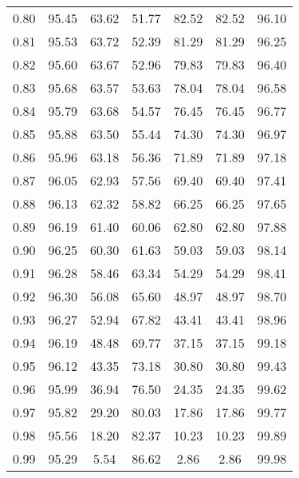 \begin{tabular}{|c|c|c|c|c|c|c|}
      0.80 &     95.45 &     63.62 &      51.77 &   82.52 &      82.52 &         96.10 \\
      0.81 &     95.53 &     63.72 &      52.39 &   81.29 &      81.29 &         96.25 \\
      0.82 &     95.60 &     63.67 &      52.96 &   79.83 &      79.83 &         96.40 \\
      0.83 &     95.68 &     63.57 &      53.63 &   78.04 &      78.04 &         96.58 \\
      0.84 &     95.79 &     63.68 &      54.57 &   76.45 &      76.45 &         96.77 \\
      0.85 &     95.88 &     63.50 &      55.44 &   74.30 &      74.30 &         96.97 \\
      0.86 &     95.96 &     63.18 &      56.36 &   71.89 &      71.89 &         97.18 \\
      0.87 &     96.05 &     62.93 &      57.56 &   69.40 &      69.40 &         97.41 \\
      0.88 &     96.13 &     62.32 &      58.82 &   66.25 &      66.25 &         97.65 \\
      0.89 &     96.19 &     61.40 &      60.06 &   62.80 &      62.80 &         97.88 \\
      0.90 &     96.25 &     60.30 &      61.63 &   59.03 &      59.03 &         98.14 \\
      0.91 &     96.28 &     58.46 &      63.34 &   54.29 &      54.29 &         98.41 \\
      0.92 &     96.30 &     56.08 &      65.60 &   48.97 &      48.97 &         98.70 \\
      0.93 &     96.27 &     52.94 &      67.82 &   43.41 &      43.41 &         98.96 \\
      0.94 &     96.19 &     48.48 &      69.77 &   37.15 &      37.15 &         99.18 \\
      0.95 &     96.12 &     43.35 &      73.18 &   30.80 &      30.80 &         99.43 \\
      0.96 &     95.99 &     36.94 &      76.50 &   24.35 &      24.35 &         99.62 \\
      0.97 &     95.82 &     29.20 &      80.03 &   17.86 &      17.86 &         99.77 \\
      0.98 &     95.56 &     18.20 &      82.37 &   10.23 &      10.23 &         99.89 \\
      0.99 &     95.29 &      5.54 &      86.62 &    2.86 &       2.86 &         99.98 \\
\bottomrule
\end{tabular}
